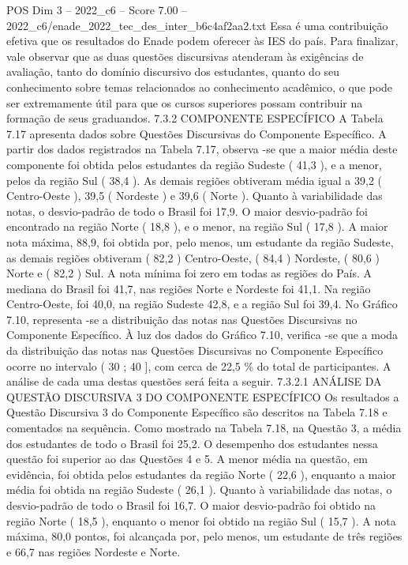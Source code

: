 \begin{textsample}{POS Dim 3 – 2022\_c6 – Score 7.00 – 2022\_c6/enade\_2022\_tec\_des\_inter\_b6c4af2aa2.txt}
Essa é uma contribuição efetiva que os resultados do Enade podem oferecer às IES do país.
Para finalizar, vale observar que as duas questões discursivas atenderam às exigências de avaliação, tanto do domínio discursivo dos estudantes, quanto do seu conhecimento sobre temas relacionados ao conhecimento acadêmico, o que pode ser extremamente útil para que os cursos superiores possam contribuir na formação de seus graduandos. 7.3.2 COMPONENTE ESPECÍFICO A Tabela 7.17 apresenta dados sobre Questões Discursivas do Componente Específico.
A partir dos dados registrados na Tabela 7.17, observa -se que a maior média deste componente foi obtida pelos estudantes da região Sudeste ( 41,3 ), e a menor, pelos da região Sul ( 38,4 ).
As demais regiões obtiveram média igual a 39,2 ( Centro-Oeste ), 39,5 ( Nordeste ) e 39,6 ( Norte ).
Quanto à variabilidade das notas, o desvio-padrão de todo o Brasil foi 17,9.
O maior desvio-padrão foi encontrado na região Norte ( 18,8 ), e o menor, na região Sul ( 17,8 ).
A maior nota máxima, 88,9, foi obtida por, pelo menos, um estudante da região Sudeste, as demais regiões obtiveram ( 82,2 ) Centro-Oeste, ( 84,4 ) Nordeste, ( 80,6 ) Norte e ( 82,2 ) Sul.
A nota mínima foi zero em todas as regiões do País.
A mediana do Brasil foi 41,7, nas regiões Norte e Nordeste foi 41,1.
Na região Centro-Oeste, foi 40,0, na região Sudeste 42,8, e a região Sul foi 39,4.
No Gráfico 7.10, representa -se a distribuição das notas nas Questões Discursivas no Componente Específico.
À luz dos dados do Gráfico 7.10, verifica -se que a moda da distribuição das notas nas Questões Discursivas no Componente Específico ocorre no intervalo ( 30 ; 40 ], com cerca de 22,5 \% do total de participantes.
A análise de cada uma destas questões será feita a seguir. 7.3.2.1 ANÁLISE DA QUESTÃO DISCURSIVA 3 DO COMPONENTE ESPECÍFICO Os resultados a Questão Discursiva 3 do Componente Específico são descritos na Tabela 7.18 e comentados na sequência.
Como mostrado na Tabela 7.18, na Questão 3, a média dos estudantes de todo o Brasil foi 25,2.
O desempenho dos estudantes nessa questão foi superior ao das Questões 4 e 5.
A menor média na questão, em evidência, foi obtida pelos estudantes da região Norte ( 22,6 ), enquanto a maior média foi obtida na região Sudeste ( 26,1 ).
Quanto à variabilidade das notas, o desvio-padrão de todo o Brasil foi 16,7.
O maior desvio-padrão foi obtido na região Norte ( 18,5 ), enquanto o menor foi obtido na região Sul ( 15,7 ).
A nota máxima, 80,0 pontos, foi alcançada por, pelo menos, um estudante de três regiões e 66,7 nas regiões Nordeste e Norte.

\end{textsample}
